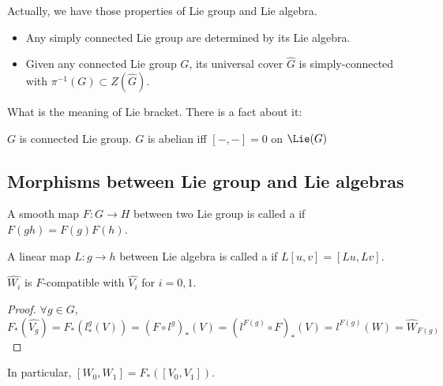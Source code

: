 Actually, we have those properties of Lie group and Lie algebra.
\begin{itemize}
    \item Any simply connected Lie group are determined by its Lie algebra.
    \item Given any connected Lie group  $ G $, its universal cover  $ \hat{G} $  is simply-connected with  $ \pi^{-1}(G)\subset Z(\hat{G}) $. 
\end{itemize}
What is the meaning of Lie bracket. There is a fact about it:
\begin{fact}
     $ G $ is connected Lie group.  $ G $ is abelian iff  $ [-,-]=0 $ on  $ \Lie(G) $    
\end{fact}
\subsection{Morphisms between Lie group and Lie algebras}
A smooth map  $ F:G\rightarrow H $ between two Lie group is called a  if  $ F(gh)=F(g)F(h) $.

A linear map  $ L:g\rightarrow h$ between Lie algebra is called a  if  $ L[u,v]=[Lu,Lv] $. 
\begin{claim}
     $ \hat{W_i} $ is  $ F $-compatible with  $ \hat{V_i} $ for  $ i=0,1 $.    
\end{claim}
\begin{proof}
     $ \forall g\in G $,  $ F_*(\hat{V_g})=F_*(l_*^g(V))=(F\circ l^g)_*(V)=(l^{F(g)}\circ F)_*(V)=l^{F(g)}(W)=\hat{W}_{F(g)} $  
\end{proof}
In particular,  $ [W_0,W_1]=F_*([V_0,V_1]) $. 